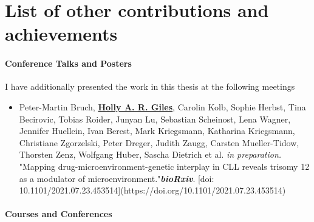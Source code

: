 \documentclass[11pt, a4paper, twosided]{book}
\begin{document}
    \hypertarget{list-of-other-contributions-and-achievements}{%
    \chapter*{List of other contributions and achievements}\label{list-of-other-contributions-and-achievements}}

    \hypertarget{conference-talks-and-posters}{%
    \subsubsection*{Conference Talks and Posters}\label{conference-talks-and-posters}}

    I have additionally presented the work in this thesis at the following meetings\\
    \begin{itemize}
      \item  Peter-Martin Bruch\ast,  \textbf{\underline{Holly A. R. Giles}}\ast, Carolin Kolb, Sophie Herbst, Tina Becirovic, Tobias Roider, Junyan Lu, Sebastian Scheinost, Lena Wagner, Jennifer Huellein, Ivan Berest, Mark Kriegsmann, Katharina Kriegsmann, Christiane Zgorzelski, Peter Dreger, Judith Zaugg, Carsten Mueller-Tidow, Thorsten Zenz, Wolfgang Huber, Sascha Dietrich et al. \textit{in preparation.}  "Mapping drug-microenvironment-genetic interplay in CLL reveals trisomy 12 as a modulator of microenvironment."\textbf{\textit{bioRxiv}}. [doi: 10.1101/2021.07.23.453514](https://doi.org/10.1101/2021.07.23.453514)
    \end{itemize}
    \hypertarget{courses-and-conferences}{%
    \subsubsection*{Courses and Conferences}\label{courses-and-conferences}}
\end{document}
